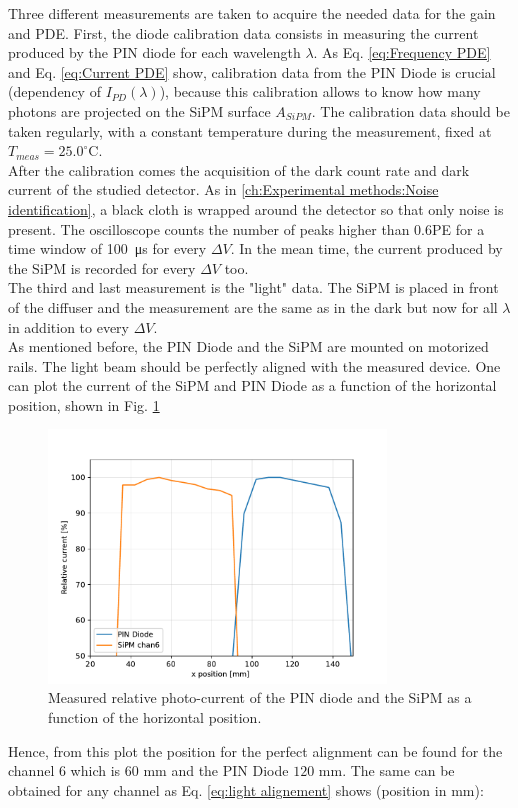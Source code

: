 Three different measurements are taken to acquire the needed data for the gain and PDE. First, the diode calibration data consists in measuring the current produced by the PIN diode for each wavelength $\lambda$.  As Eq. \eqref{eq:Frequency PDE} and Eq. \eqref{eq:Current PDE} show, calibration data from the PIN Diode is crucial (dependency of $I_{PD}(\lambda)$), because this calibration allows to know how many photons are projected on the SiPM surface $A_{SiPM}$. The calibration data should be taken regularly, with a constant temperature during the measurement, fixed at $T_{meas} = 25.0 ^{\circ}$C.
\\
After the calibration comes the acquisition of the dark count rate and dark current of the studied detector. As in \ref{ch:Experimental methods:Noise identification}, a black cloth is wrapped around the detector so that only noise is present. The oscilloscope counts the number of peaks higher than $0.6$PE for a time window of \SI{100}{\micro s} for every $\Delta V$. In the mean time, the current produced by the SiPM is recorded for every $\Delta V$ too.
\\
The third and last measurement is the "light" data. The SiPM is placed in front of the diffuser and the measurement are the same as in the dark but now for all $\lambda$ in addition to every $\Delta V$.
\\
As mentioned before, the PIN Diode and the SiPM are mounted on motorized rails. The light beam should be perfectly aligned with the measured device. One can plot the current of the SiPM and PIN Diode as a function of the horizontal position, shown in Fig. \ref{fig:light alignment positions}
\begin{figure}[http]
    \centering    
    \includegraphics[width=0.8\textwidth]{gfx/plots/positions.pdf}
    \caption{Measured relative photo-current of the PIN diode and the SiPM as a function of the horizontal position. }
    \label{fig:light alignment positions}
\end{figure}
Hence, from this plot the position for the perfect alignment can be found for the channel $6$  which is $60 $ mm and the PIN Diode $120 $ mm. The same can be obtained for any channel as Eq. \eqref{eq:light alignement} shows (position in mm):

